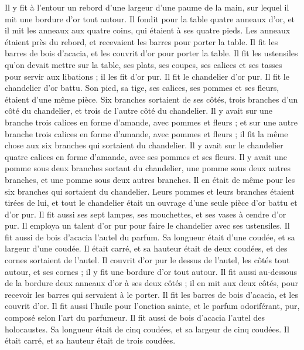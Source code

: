 \begin{multicols}{2}
Il y fit à l'entour un rebord d’une largeur d’une paume de la main, sur lequel il mit une bordure d’or tout autour.
Il fondit pour la table quatre anneaux d'or, et il mit les anneaux aux quatre coins, qui étaient à ses quatre pieds.
Les anneaux étaient près du rebord, et recevaient les barres pour porter la table.
Il fit les barres de bois d’acacia, et les couvrit d'or pour porter la table.
Il fit les ustensiles qu’on devait mettre sur la table, ses plats, ses coupes, ses calices et ses tasses pour servir aux libations ; il les fit d’or pur.
Il fit le chandelier d’or pur. Il fit le chandelier d’or battu. Son pied, sa tige, ses calices, ses pommes et ses fleurs, étaient d’une même pièce.
Six branches sortaient de ses côtés, trois branches d'un côté du chandelier, et trois de l'autre côté du chandelier.
Il y avait sur une branche trois calices en forme d'amande, avec pommes et fleurs ; et sur une autre branche trois calices en forme d'amande, avec pommes et fleurs ; il fit la même chose aux six branches qui sortaient du chandelier.
Il y avait sur le chandelier quatre calices en forme d'amande, avec ses pommes et ses fleurs.
Il y avait une pomme sous deux branches sortant du chandelier, une pomme sous deux autres branches, et une pomme sous deux autres branches. Il en était de même pour les six branches qui sortaient du chandelier.
Leurs pommes et leurs branches étaient tirées de lui, et tout le chandelier était un ouvrage d'une seule pièce d’or battu et d’or pur.
Il fit aussi ses sept lampes, ses mouchettes, et ses vases à cendre d’or pur.
Il employa un talent d’or pur pour faire le chandelier avec ses ustensiles.
Il fit aussi de bois d’acacia l'autel du parfum. Sa longueur était d'une coudée, et sa largeur d'une coudée. Il était carré, et sa hauteur était de deux coudées, et des cornes sortaient de l’autel.
Il couvrit d’or pur le dessus de l'autel, les côtés tout autour, et ses cornes ; il y fit une bordure d’or tout autour.
Il fit aussi au-dessous de la bordure deux anneaux d'or à ses deux côtés ; il en mit aux deux côtés, pour recevoir les barres qui servaient à le porter.
Il fit les barres de bois d’acacia, et les couvrit d'or.
Il fit aussi l'huile pour l'onction sainte, et le parfum odoriférant, pur, composé selon l’art du parfumeur.
\VerseOne{}Il fit aussi de bois d’acacia l'autel des holocaustes. Sa longueur était de cinq coudées, et sa largeur de cinq coudées. Il était carré, et sa hauteur était de trois coudées.

\end{multicols}
